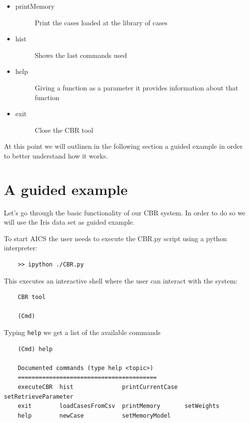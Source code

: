 \documentclass[11pt]{article}
\begin{document}
\begin{itemize}
\begin{description}
    \end{description}              
    \item \begin{description}
        \item[printMemory] Print the cases loaded at the library of cases 
    \end{description}              
    \item \begin{description}
        \item[hist] Shows the last commands used
    \end{description}              
    \item \begin{description}
        \item[help] Giving a function as a parameter it provides information about that function
    \end{description}             
    \item \begin{description}
        \item[exit] Close the CBR tool
    \end{description}              
\end{itemize}

At this point we will outlinen in the following section a guided example in order to better understand how it works.
\section{A guided example}


Let's go through the basic functionality of our CBR system. In order to do so we will use the Iris data set as guided example.

To start AICS the user needs to execute the CBR.py script using a python interpreter:
\begin{verbatim}
    >> ipython ./CBR.py
\end{verbatim}
This executes an interactive shell where the user can interact with the system:
\begin{verbatim}
    CBR tool

    (Cmd)
\end{verbatim}
Typing \texttt{help} we get a list of the available commands
\begin{verbatim}
    (Cmd) help
    
    Documented commands (type help <topic>)
    ========================================
    executeCBR  hist              printCurrentCase  setRetrieveParameter
    exit        loadCasesFromCsv  printMemory       setWeights
    help        newCase           setMemoryModel

\end{verbatim}
\end{document}
